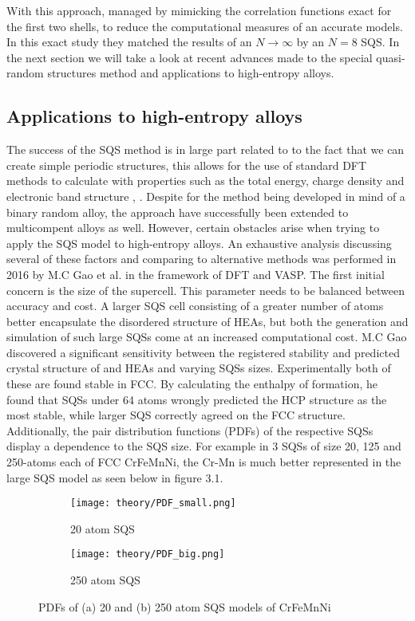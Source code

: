 With this approach, \cite{sqsfull} managed by mimicking the correlation functions exact for the first two shells, to reduce the computational measures of an accurate models. In this exact study they matched the results of an $N \rightarrow \infty$ by an $N=8$ SQS. In the next section we will take a look at recent advances made to the special quasi-random structures method and applications to high-entropy alloys. 

\subsection{Applications to high-entropy alloys}
The success of the SQS method is in large part related to to the fact that we can create simple periodic structures, this allows for the use of standard DFT methods to calculate with properties such as the total energy, charge density and electronic band structure \cite{sqs_dos}, \cite{sqs_bg}. Despite for the method being developed in mind of a binary random alloy, the approach have successfully been extended to multicompent alloys as well. However, certain obstacles arise when trying to apply the SQS model to high-entropy alloys. An exhaustive analysis discussing several of these factors and comparing to alternative methods was performed in 2016 by M.C Gao et al. \cite{hea2016_ch10}  in the framework of DFT and VASP. The first initial concern is the size of the supercell. This parameter  needs to be balanced between accuracy and cost. A larger SQS cell consisting of a greater number of atoms better encapsulate the disordered structure of HEAs, but both the generation and simulation of such large SQSs come at an increased computational cost. M.C Gao discovered a significant sensitivity between the registered stability and predicted crystal structure of  and  HEAs and varying SQSs sizes. Experimentally both of these are found stable in FCC. By calculating the enthalpy of formation, he found that SQSs under 64 atoms wrongly predicted the HCP structure as the most stable, while larger SQS correctly agreed on the FCC structure. Additionally, the pair distribution functions (PDFs) of the respective SQSs display a dependence to the SQS size. For example in 3 SQSs of size 20, 125 and 250-atoms each of FCC CrFeMnNi, the Cr-Mn is much better represented in the large SQS model as seen below in figure 3.1.

\begin{figure}[H]
\begin{subfigure}{.5\textwidth}
\texttt{[image: theory/PDF\_small.png]}
\caption{20 atom SQS}	
\end{subfigure}
\begin{subfigure}{.5\textwidth}
\texttt{[image: theory/PDF\_big.png]}
\caption{250 atom SQS}
\end{subfigure}
\caption{PDFs of (a) 20 and (b) 250 atom SQS models of CrFeMnNi \cite{hea2016_ch10}}
\end{figure}
     
